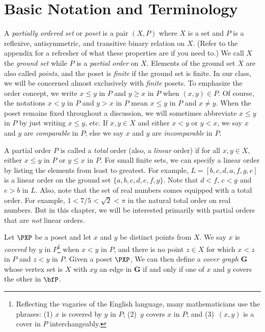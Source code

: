 \section{Basic Notation and Terminology}\label{s:posets:intro}

A \textit{partially ordered set} or \textit{poset} is a pair $(X,P)$
where $X$ is a set and $P$ is a reflexive, antisymmetric, and
transitive binary relation on $X$. (Refer to the appendix for a
refresher of what these properties are if you need to.) We call $X$
the \textit{ground set} while $P$ is a \textit{partial order} on
$X$. Elements of the ground set $X$ are also called \textit{points},
and the poset is \textit{finite} if the ground set is finite.  In our
class, we will be concerned almost exclusively with \textit{finite}
posets. To emphasize the order concept, we write $x\le y$ in $P$ and
$y\ge x$ in $P$ when $(x,y)\in P$. Of course, the notations $x<y$ in
$P$ and $y>x$ in $P$ mean $x\le y$ in $P$ and $x\ne y$. When the poset
remains fixed throughout a discussion, we will sometimes abbreviate
$x\le y$ in $P$ by just writing $x\le y$, etc.  If $x,y\in X$ and either $x<y$ or $y<x$, we
say $x$ and $y$ are \textit{comparable} in $P$; else
we say $x$ and $y$ are \textit{incomparable} in $P$.

A partial order $P$ is called a \textit{total} order (also, a 
\textit{linear} order) if for all $x,y\in X$, either $x\le y$ in $P$
or $y\le x$ in $P$.  For small finite sets, we can specify a linear
order by listing the elements from least to greatest.  For example,
$L=[b,c,d,a,f,g,e]$ is a linear order on the ground set $\{a,b,c,d,e,f,g\}$.
Note that $d <f$, $c<g$ and $e>b$ in $L$.  Also, note that the set of
real numbers comes equipped with a total order.  For example,
$1<7/5<\sqrt{2}<\pi$ in the natural total order on real numbers.  
But in this chapter, we will be interested
primarily with partial orders that are \textit{not} linear orders.

Let $\PXP$ be a poset and let $x$ and $y$ be distinct points from $X$.
We say $x$ is \textit{covered} by $y$ in $P$\footnote{Reflecting
the vagaries of the English language, many mathematicians use the
phrases: (1) $x$ is covered by $y$ in $P$; (2)~$y$ covers $x$ in
$P$; and (3)~$(x,y)$ is a cover in $P$ interchangeably.}
when $x<y$ in $P$, and there is no point $z\in X$ for
which $x<z$ in $P$ and $z<y$ in $P$.  Given a poset $\PXP$,
We can then define a \textit{cover graph} $\mathbf{G}$ whose vertex set
is $X$ with $xy$ an edge in $\mathbf{G}$ if and only if one of $x$
and $y$ covers the other in $\bfP$.

